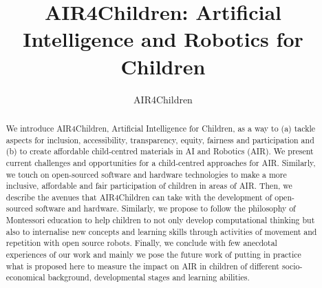 \documentclass[sigconf]{acmart}
\begin{document}
\title{AIR4Children: Artificial Intelligence and Robotics for Children}


\author{AIR4Children}


\renewcommand{\shortauthors}{AIR4Children}

\begin{abstract}
We introduce AIR4Children, Artificial Intelligence for Children, as a way to (a) tackle aspects for inclusion, accessibility, transparency, equity, fairness and participation and (b) to create affordable child-centred materials in AI and Robotics (AIR).
We present current challenges and opportunities for a child-centred approaches for AIR. 
Similarly, we touch on open-sourced software and hardware technologies to make a more inclusive, affordable and fair participation of children in areas of AIR. 
Then, we describe the avenues that AIR4Children can take with the development of open-sourced software and hardware.
Similarly, we propose to follow the philosophy of Montessori education to help children to not only develop computational thinking but also to internalise new concepts and learning skills through activities of movement and repetition with open source robots.
Finally, we conclude with few anecdotal experiences of our work and mainly we pose the future work of putting in practice what is proposed here to measure the impact on AIR in children of different socio-economical background, developmental stages and learning abilities. 
\end{abstract}
\end{document}

